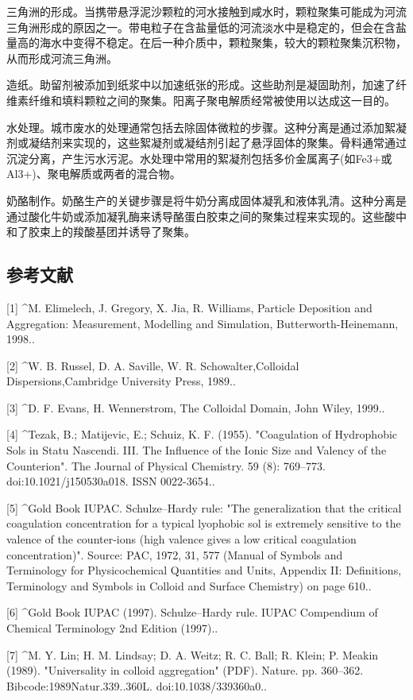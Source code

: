 三角洲的形成。当携带悬浮泥沙颗粒的河水接触到咸水时，颗粒聚集可能成为河流三角洲形成的原因之一。带电粒子在含盐量低的河流淡水中是稳定的，但会在含盐量高的海水中变得不稳定。在后一种介质中，颗粒聚集，较大的颗粒聚集沉积物，从而形成河流三角洲。

造纸。助留剂被添加到纸浆中以加速纸张的形成。这些助剂是凝固助剂，加速了纤维素纤维和填料颗粒之间的聚集。阳离子聚电解质经常被使用以达成这一目的。

水处理。城市废水的处理通常包括去除固体微粒的步骤。这种分离是通过添加絮凝剂或凝结剂来实现的，这些絮凝剂或凝结剂引起了悬浮固体的聚集。骨料通常通过沉淀分离，产生污水污泥。水处理中常用的絮凝剂包括多价金属离子(如Fe3+或Al3+)、聚电解质或两者的混合物。

奶酪制作。奶酪生产的关键步骤是将牛奶分离成固体凝乳和液体乳清。这种分离是通过酸化牛奶或添加凝乳酶来诱导酪蛋白胶束之间的聚集过程来实现的。这些酸中和了胶束上的羧酸基团并诱导了聚集。

\subsection{参考文献}
[1]
^M. Elimelech, J. Gregory, X. Jia, R. Williams, Particle Deposition and Aggregation: Measurement, Modelling and Simulation, Butterworth-Heinemann, 1998..

[2]
^W. B. Russel, D. A. Saville, W. R. Schowalter,Colloidal Dispersions,Cambridge University Press, 1989..

[3]
^D. F. Evans, H. Wennerstrom, The Colloidal Domain, John Wiley, 1999..

[4]
^Tezak, B.; Matijevic, E.; Schuiz, K. F. (1955). "Coagulation of Hydrophobic Sols in Statu Nascendi. III. The Influence of the Ionic Size and Valency of the Counterion". The Journal of Physical Chemistry. 59 (8): 769–773. doi:10.1021/j150530a018. ISSN 0022-3654..

[5]
^Gold Book IUPAC. Schulze–Hardy rule: "The generalization that the critical coagulation concentration for a typical lyophobic sol is extremely sensitive to the valence of the counter-ions (high valence gives a low critical coagulation concentration)". Source: PAC, 1972, 31, 577 (Manual of Symbols and Terminology for Physicochemical Quantities and Units, Appendix II: Definitions, Terminology and Symbols in Colloid and Surface Chemistry) on page 610..

[6]
^Gold Book IUPAC (1997). Schulze–Hardy rule. IUPAC Compendium of Chemical Terminology 2nd Edition (1997)..

[7]
^M. Y. Lin; H. M. Lindsay; D. A. Weitz; R. C. Ball; R. Klein; P. Meakin (1989). "Universality in colloid aggregation" (PDF). Nature. pp. 360–362. Bibcode:1989Natur.339..360L. doi:10.1038/339360a0..

